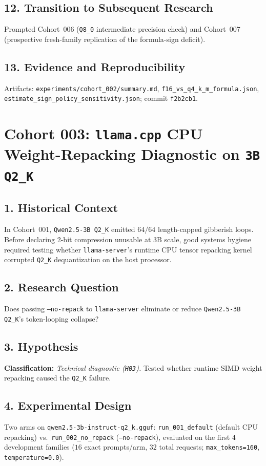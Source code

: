 \subsection*{12. Transition to Subsequent Research}
Prompted Cohort~006 (\texttt{Q8\_0} intermediate precision check) and Cohort~007 (prospective fresh-family replication of the formula-sign deficit).

\subsection*{13. Evidence and Reproducibility}
Artifacts: \texttt{experiments/cohort\_002/summary.md}, \texttt{f16\_vs\_q4\_k\_m\_formula.json}, \texttt{estimate\_sign\_policy\_sensitivity.json}; commit \texttt{f2b2cb1}.

\section{Cohort 003: \texttt{llama.cpp} CPU Weight-Repacking Diagnostic on \texttt{3B Q2\_K}}

\subsection*{1. Historical Context}
In Cohort~001, \texttt{Qwen2.5-3B Q2\_K} emitted $64/64$ length-capped gibberish loops. Before declaring 2-bit compression unusable at 3B scale, good systems hygiene required testing whether \texttt{llama-server}'s runtime CPU tensor repacking kernel corrupted \texttt{Q2\_K} dequantization on the host processor.

\subsection*{2. Research Question}
Does passing \texttt{--no-repack} to \texttt{llama-server} eliminate or reduce \texttt{Qwen2.5-3B Q2\_K}'s token-looping collapse?

\subsection*{3. Hypothesis}
\textbf{Classification:} \emph{Technical diagnostic (\texttt{H03}).} Tested whether runtime SIMD weight repacking caused the \texttt{Q2\_K} failure.

\subsection*{4. Experimental Design}
Two arms on \texttt{qwen2.5-3b-instruct-q2\_k.gguf}: \texttt{run\_001\_default} (default CPU repacking) vs.\ \texttt{run\_002\_no\_repack} (\texttt{--no-repack}), evaluated on the first $4$ development families ($16$ exact prompts/arm, $32$ total requests; \texttt{max\_tokens=160}, \texttt{temperature=0.0}).

